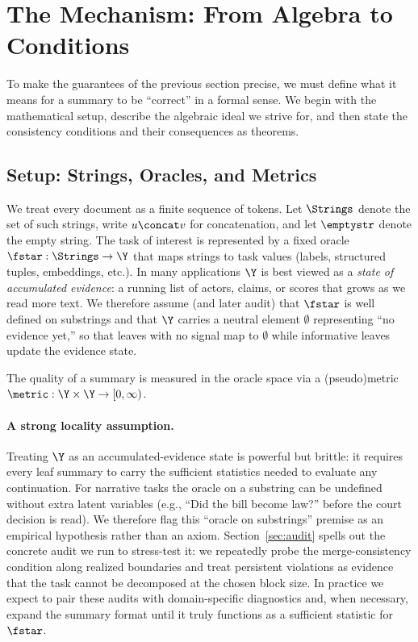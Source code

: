 \section{The Mechanism: From Algebra to Conditions}\label{sec:mechanism}

To make the guarantees of the previous section precise, we must define what it means for a summary to be ``correct'' in a formal sense. We begin with the mathematical setup, describe the algebraic ideal we strive for, and then state the consistency conditions and their consequences as theorems.

\subsection{Setup: Strings, Oracles, and Metrics}

We treat every document as a finite sequence of tokens. Let $\Strings$ denote the set of such strings, write $u \concat v$ for concatenation, and let $\emptystr$ denote the empty string. The task of interest is represented by a fixed oracle $\fstar: \Strings \to \Y$ that maps strings to task values (labels, structured tuples, embeddings, etc.). In many applications $\Y$ is best viewed as a \emph{state of accumulated evidence}: a running list of actors, claims, or scores that grows as we read more text. We therefore assume (and later audit) that $\fstar$ is well defined on substrings and that $\Y$ carries a neutral element $\emptyset$ representing ``no evidence yet,'' so that leaves with no signal map to $\emptyset$ while informative leaves update the evidence state.

The quality of a summary is measured in the oracle space via a (pseudo)metric $\metric: \Y \times \Y \to [0, \infty)$.

\paragraph{A strong locality assumption.}
Treating $\Y$ as an accumulated-evidence state is powerful but brittle: it requires every leaf summary to carry the sufficient statistics needed to evaluate any continuation. For narrative tasks the oracle on a substring can be undefined without extra latent variables (e.g., ``Did the bill become law?'' before the court decision is read). We therefore flag this ``oracle on substrings'' premise as an empirical hypothesis rather than an axiom. Section~\ref{sec:audit} spells out the concrete audit we run to stress-test it: we repeatedly probe the merge-consistency condition along realized boundaries and treat persistent violations as evidence that the task cannot be decomposed at the chosen block size. In practice we expect to pair these audits with domain-specific diagnostics and, when necessary, expand the summary format until it truly functions as a sufficient statistic for $\fstar$.

